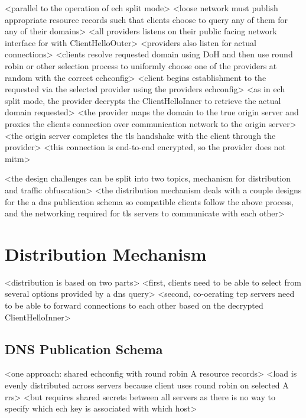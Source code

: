 <parallel to the operation of ech split mode>
<loose network must publish appropriate resource records such that clients choose to query any of them for any of their domains>
<all providers listens on their public facing network interface for with ClientHelloOuter>
<providers also listen for actual connections>
<clients resolve requested domain using DoH and then use round robin or other selection process to uniformly choose one of the providers at random with the correct echconfig>
<client begins establishment to the requested via the selected provider using the providers echconfig>
<as in ech split mode, the provider decrypts the ClientHelloInner to retrieve the actual domain requested>
<the provider maps the domain to the true origin server and proxies the clients connection over communication network to the origin server>
<the origin server completes the tls handshake with the client through the provider>
<this connection is end-to-end encrypted, so the provider does not mitm>

<the design challenges can be split into two topics, mechanism for distribution and traffic obfuscation>
<the distribution mechanism deals with a couple designs for the a dns publication schema so compatible clients follow the above process, and the networking required for tls servers to communicate with each other>







\section{Distribution Mechanism}

<distribution is based on two parts>
<first, clients need to be able to select from several options provided by a dns query>
<second, co-oerating tcp servers need to be able to forward connections to each other based on the decrypted ClientHelloInner>

\subsection{DNS Publication Schema}

<one approach: shared echconfig with round robin A resource records>
<load is evenly distributed across servers because client uses round robin on selected A rrs>
<but requires shared secrets between all servers as there is no way to specify which ech key is associated with which host>

